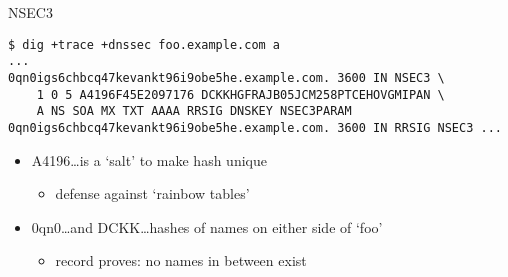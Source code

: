 \begin{frame}[fragile]{NSEC3}
\begin{Verbatim}[fontsize=\fontsize{9}{10}]
$ dig +trace +dnssec foo.example.com a
...
0qn0igs6chbcq47kevankt96i9obe5he.example.com. 3600 IN NSEC3 \
    1 0 5 A4196F45E2097176 DCKKHGFRAJB05JCM258PTCEHOVGMIPAN \
    A NS SOA MX TXT AAAA RRSIG DNSKEY NSEC3PARAM
0qn0igs6chbcq47kevankt96i9obe5he.example.com. 3600 IN RRSIG NSEC3 ...
\end{Verbatim}
\begin{itemize}
\item A4196\ldots is a `salt' to make hash unique
    \begin{itemize}
    \item defense against `rainbow tables'
    \end{itemize}
\item 0qn0\ldots and DCKK\ldots hashes of names on either side of `foo'
    \begin{itemize}
    \item record proves: no names in between exist
    \end{itemize}
\end{itemize}
\end{frame}
